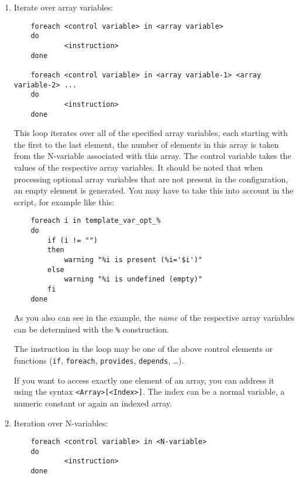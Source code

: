     \begin{enumerate}
    \item Iterate over array variables:

\begin{example}
\begin{verbatim}
    foreach <control variable> in <array variable>
    do
            <instruction>
    done

    foreach <control variable> in <array variable-1> <array variable-2> ...
    do
            <instruction>
    done
\end{verbatim}
\end{example}

    This loop iterates over all of the specified array variables, each
    starting with the first to the last element, the number of elements
    in this array is taken from the N-variable associated with this array.
    The control variable takes the values of the respective array variables.
    It should be noted that when processing optional array variables that are
    not present in the configuration, an empty element is generated. You may
    have to take this into account in the script, for example like this:

\begin{example}
\begin{verbatim}
    foreach i in template_var_opt_%
    do
        if (i != "")
        then
            warning "%i is present (%i='$i')"
        else
            warning "%i is undefined (empty)"
        fi
    done
\end{verbatim}
\end{example}

    As you also can see in the example, the \emph{name} of the respective
    array variables can be determined with the \texttt{\%<control variable>}
    construction.

    The instruction in the loop may be one of the above
    control elements or functions (\texttt{if}, \texttt{foreach},
    \texttt{provides}, \texttt{depends}, \ldots).

    If you want to access exactly one element of an array, you can address it
    using the syntax \texttt{<Array>[<Index>]}. The index can be a normal variable,
    a numeric constant or again an indexed array.

    \item Iteration over N-variables:

\begin{example}
\begin{verbatim}
    foreach <control variable> in <N-variable>
    do
            <instruction>
    done
\end{verbatim}
\end{example}


\end{enumerate}
